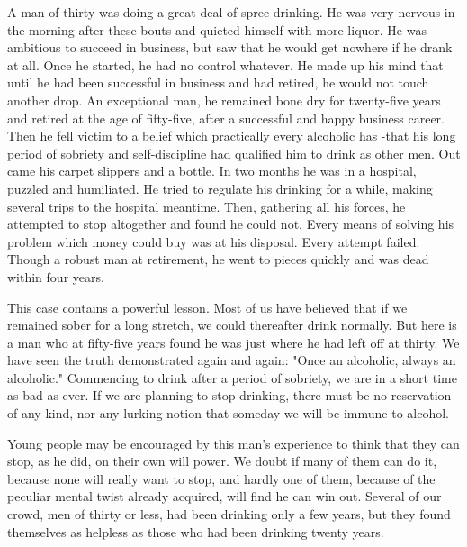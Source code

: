\begin{biblechapter}

A man of thirty was doing a great deal of spree drinking. 
He was very nervous in the morning after these bouts and quieted himself with more liquor. 
He was ambitious to succeed in business, 
but saw that he would get nowhere if he drank at all. 
Once he started, he had no control whatever. 
He made up his mind that until he had been successful in business and had retired, 
he would not touch another drop. 
An exceptional man, he remained bone dry for twenty-five years 
and retired at the age of fifty-five, 
after a successful and happy business career. 
Then he fell victim to a belief which practically every alcoholic has
-that his long period of sobriety and self-discipline had qualified him to drink as other men. 
Out came his carpet slippers and a bottle. 
In two months he was in a hospital, puzzled and humiliated. 
He tried to regulate his drinking for a while, 
making several trips to the hospital meantime. 
Then, gathering all his forces, he attempted to stop altogether and found he could not. 
Every means of solving his problem which money could buy was at his disposal. 
Every attempt failed. 
Though a robust man at retirement, 
he went to pieces quickly and was dead within four years.

This case contains a powerful lesson. 
Most of us have believed that if we remained sober for a long stretch, 
we could thereafter drink normally. 
But here is a man who at fifty-five years found he was just where he had left off at thirty. 
We have seen the truth demonstrated again and again: 
"Once an alcoholic, always an alcoholic." 
Commencing to drink after a period of sobriety, we are in a short time as bad as ever. 
If we are planning to stop drinking, there must be no reservation of any kind, 
nor any lurking notion that someday we will be immune to alcohol.

Young people may be encouraged by this man's experience to think that they can stop, 
as he did, on their own will power. 
We doubt if many of them can do it, because none will really want to stop, 
and hardly one of them, because of the peculiar mental twist already acquired, 
will find he can win out. 
Several of our crowd, men of thirty or less, had been drinking only a few years, 
but they found themselves as helpless as those who had been drinking twenty years.
\end{biblechapter}


